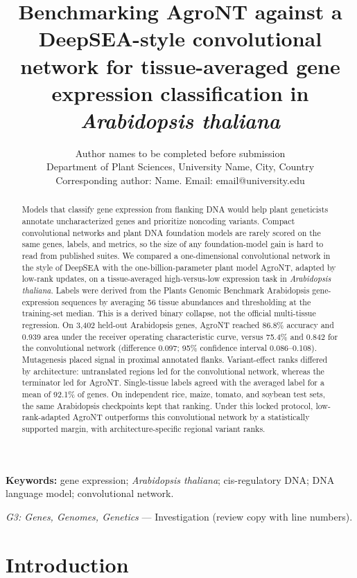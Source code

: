 \documentclass[11pt]{article}
\title{Benchmarking AgroNT against a DeepSEA-style convolutional network for tissue-averaged gene expression classification in \emph{Arabidopsis thaliana}}
\author{Author names to be completed before submission\\
Department of Plant Sciences, University Name, City, Country\\
Corresponding author: Name. Email: email@university.edu}
\date{}
\begin{document}
\onehalfspacing
\maketitle
\begin{abstract}
Models that classify gene expression from flanking DNA would help plant geneticists annotate uncharacterized genes and prioritize noncoding variants. Compact convolutional networks and plant DNA foundation models are rarely scored on the same genes, labels, and metrics, so the size of any foundation-model gain is hard to read from published suites. We compared a one-dimensional convolutional network in the style of DeepSEA with the one-billion-parameter plant model AgroNT, adapted by low-rank updates, on a tissue-averaged high-versus-low expression task in \emph{Arabidopsis thaliana}. Labels were derived from the Plants Genomic Benchmark Arabidopsis gene-expression sequences by averaging 56 tissue abundances and thresholding at the training-set median. This is a derived binary collapse, not the official multi-tissue regression. On 3,402 held-out Arabidopsis genes, AgroNT reached 86.8\% accuracy and 0.939 area under the receiver operating characteristic curve, versus 75.4\% and 0.842 for the convolutional network (difference 0.097; 95\% confidence interval 0.086--0.108). Mutagenesis placed signal in proximal annotated flanks. Variant-effect ranks differed by architecture: untranslated regions led for the convolutional network, whereas the terminator led for AgroNT. Single-tissue labels agreed with the averaged label for a mean of 92.1\% of genes. On independent rice, maize, tomato, and soybean test sets, the same Arabidopsis checkpoints kept that ranking. Under this locked protocol, low-rank-adapted AgroNT outperforms this convolutional network by a statistically supported margin, with architecture-specific regional variant ranks.
\end{abstract}

\noindent\textbf{Keywords:} gene expression; \emph{Arabidopsis thaliana}; cis-regulatory DNA; DNA language model; convolutional network.

\noindent\textit{G3: Genes, Genomes, Genetics} --- Investigation (review copy with line numbers).













\section{Introduction}
\end{document}
